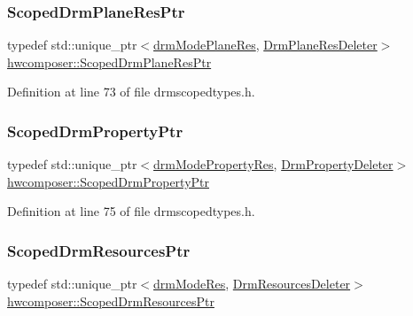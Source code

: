 \subsubsection{\texorpdfstring{Scoped\+Drm\+Plane\+Res\+Ptr}{ScopedDrmPlaneResPtr}}
{\footnotesize\ttfamily typedef std\+::unique\+\_\+ptr$<$\mbox{\hyperlink{drmscopedtypes_8h_abc090a2f00ebaea9426f9a5636f40994}{drm\+Mode\+Plane\+Res}}, \mbox{\hyperlink{structhwcomposer_1_1DrmPlaneResDeleter}{Drm\+Plane\+Res\+Deleter}}$>$ \mbox{\hyperlink{namespacehwcomposer_a0f1486ef5a49e79373fe75dfd767b85f}{hwcomposer\+::\+Scoped\+Drm\+Plane\+Res\+Ptr}}}



Definition at line 73 of file drmscopedtypes.\+h.

\mbox{\label{namespacehwcomposer_ae4038d517ff95af940c1f9cdf40e3834}} 
\subsubsection{\texorpdfstring{Scoped\+Drm\+Property\+Ptr}{ScopedDrmPropertyPtr}}
{\footnotesize\ttfamily typedef std\+::unique\+\_\+ptr$<$\mbox{\hyperlink{drmscopedtypes_8h_a4fb7f6f576c5cfbc7ee86d566c5c8673}{drm\+Mode\+Property\+Res}}, \mbox{\hyperlink{structhwcomposer_1_1DrmPropertyDeleter}{Drm\+Property\+Deleter}}$>$ \mbox{\hyperlink{namespacehwcomposer_ae4038d517ff95af940c1f9cdf40e3834}{hwcomposer\+::\+Scoped\+Drm\+Property\+Ptr}}}



Definition at line 75 of file drmscopedtypes.\+h.

\mbox{\label{namespacehwcomposer_a88e61b5e1ae620a5424a9497d554aea7}} 
\subsubsection{\texorpdfstring{Scoped\+Drm\+Resources\+Ptr}{ScopedDrmResourcesPtr}}
{\footnotesize\ttfamily typedef std\+::unique\+\_\+ptr$<$\mbox{\hyperlink{drmscopedtypes_8h_a394774c7e66da001652fbd93d026b853}{drm\+Mode\+Res}}, \mbox{\hyperlink{structhwcomposer_1_1DrmResourcesDeleter}{Drm\+Resources\+Deleter}}$>$ \mbox{\hyperlink{namespacehwcomposer_a88e61b5e1ae620a5424a9497d554aea7}{hwcomposer\+::\+Scoped\+Drm\+Resources\+Ptr}}}



